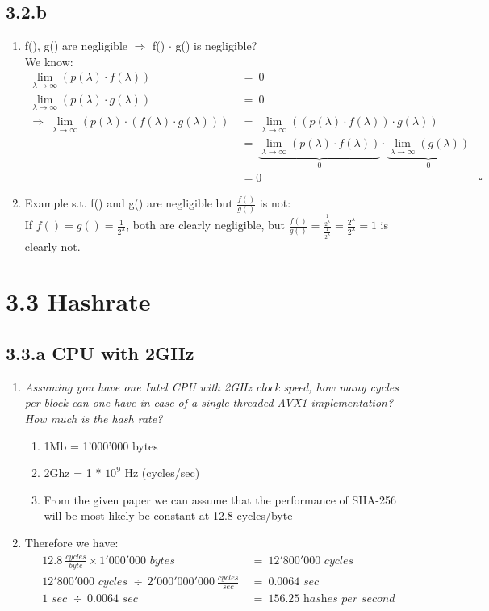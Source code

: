 \documentclass{report}
\begin{document}
	\subsection*{3.2.b}
	\begin{enumerate}[\textbullet]
		\item f(), g() are negligible $\Rightarrow$ f() $\cdot$ g() is negligible? \\
		We know:
		\begin{align*}
			\lim_{\lambda \rightarrow \infty} (p(\lambda) \cdot f(\lambda)) \ & = \ 0 \\
			\lim_{\lambda \rightarrow \infty} (p(\lambda) \cdot g(\lambda)) \ & = \ 0 \\
			\Rightarrow \ \lim_{\lambda \rightarrow \infty} (p(\lambda) \cdot (f(\lambda) \cdot g(\lambda))) \ & = \ \lim_{\lambda \rightarrow \infty} ((p(\lambda) \cdot f(\lambda)) \cdot g(\lambda)) \\
			& = \ \underbrace{\lim_{\lambda \rightarrow \infty} (p(\lambda) \cdot f(\lambda))}_0 \cdot \underbrace{\lim_{\lambda \rightarrow \infty} (g(\lambda))}_0 \\
			& = 0 & \square
		\end{align*}
		\item Example s.t. f() and g() are negligible but $\frac{f()}{g()}$ is not: \\
		If $f()=g()=\frac{1}{2^{\lambda}}$, both are clearly negligible, but $\frac{f()}{g()}= \frac{\frac{1}{2^{\lambda}}}{\frac{1}{2^{\lambda}}} = \frac{2^{\lambda}}{2^{\lambda}} = 1$ is clearly not.
	\end{enumerate}
	\section*{3.3 Hashrate}
	\subsection*{3.3.a CPU with 2GHz}
	\begin{enumerate}[]
		\item \textit{Assuming you have one Intel CPU with 2GHz clock speed, how many cycles per block can one have in case of a single-threaded AVX1 implementation? How much is the hash rate?}
		\begin{enumerate}[\textbullet]
			\item 1Mb = 1'000'000 bytes
			\item 2Ghz = 1 * $10^9$ Hz (cycles/sec)
			\item From the given paper we can assume that the performance of SHA-256 will be most likely be constant at 12.8 cycles/byte
		\end{enumerate}
		\item Therefore we have:
		\begin{align*}
			12.8 \ \frac{cycles}{byte} \times 1'000'000 \textit{ bytes } \ & = \ 12'800'000 \textit{ cycles} \\
			12'800'000 \textit{ cycles } \div \ 2'000'000'000 \ \frac{cycles}{sec} \ & = \ 0.0064 \textit{ sec} \\
			1 \textit{ sec } \div  \ 0.0064 \textit{ sec } \ & = \ 156.25 \textit{ hashes per second}
		\end{align*}
	\end{enumerate}
\end{document}

